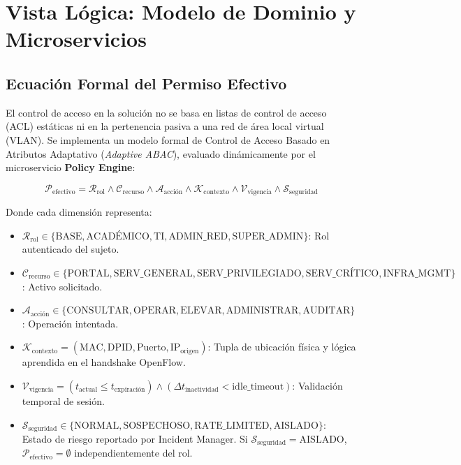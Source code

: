 \documentclass[11pt,a4paper]{report}
\begin{document}
\chapter{Vista Lógica: Modelo de Dominio y Microservicios}

\section{Ecuación Formal del Permiso Efectivo}
El control de acceso en la solución no se basa en listas de control de acceso (ACL) estáticas ni en la pertenencia pasiva a una red de área local virtual (VLAN). Se implementa un modelo formal de Control de Acceso Basado en Atributos Adaptativo (\emph{Adaptive ABAC}), evaluado dinámicamente por el microservicio \textbf{Policy Engine}:

\begin{equation}
\label{eq:abac}
\boxed{\mathcal{P}_{\text{efectivo}} = \mathcal{R}_{\text{rol}} \wedge \mathcal{C}_{\text{recurso}} \wedge \mathcal{A}_{\text{acción}} \wedge \mathcal{K}_{\text{contexto}} \wedge \mathcal{V}_{\text{vigencia}} \wedge \mathcal{S}_{\text{seguridad}}}
\end{equation}

Donde cada dimensión representa:
\begin{itemize}[leftmargin=*]
    \item $\mathcal{R}_{\text{rol}} \in \{\text{BASE}, \text{ACADÉMICO}, \text{TI}, \text{ADMIN\_RED}, \text{SUPER\_ADMIN}\}$: Rol autenticado del sujeto.
    \item $\mathcal{C}_{\text{recurso}} \in \{\text{PORTAL}, \text{SERV\_GENERAL}, \text{SERV\_PRIVILEGIADO}, \text{SERV\_CRÍTICO}, \text{INFRA\_MGMT}\}$: Activo solicitado.
    \item $\mathcal{A}_{\text{acción}} \in \{\text{CONSULTAR}, \text{OPERAR}, \text{ELEVAR}, \text{ADMINISTRAR}, \text{AUDITAR}\}$: Operación intentada.
    \item $\mathcal{K}_{\text{contexto}} = (\text{MAC}, \text{DPID}, \text{Puerto}, \text{IP}_{\text{origen}})$: Tupla de ubicación física y lógica aprendida en el handshake OpenFlow.
    \item $\mathcal{V}_{\text{vigencia}} = (t_{\text{actual}} \le t_{\text{expiración}}) \wedge (\Delta t_{\text{inactividad}} < \text{idle\_timeout})$: Validación temporal de sesión.
    \item $\mathcal{S}_{\text{seguridad}} \in \{\text{NORMAL}, \text{SOSPECHOSO}, \text{RATE\_LIMITED}, \text{AISLADO}\}$: Estado de riesgo reportado por Incident Manager. Si $\mathcal{S}_{\text{seguridad}} = \text{AISLADO}$, $\mathcal{P}_{\text{efectivo}} = \emptyset$ independientemente del rol.
\end{itemize}
\end{document}
